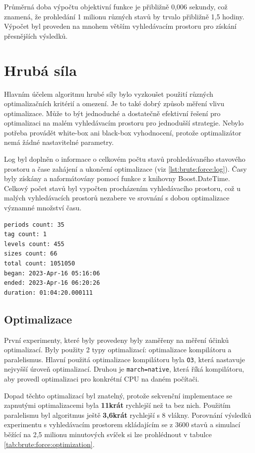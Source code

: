 Průměrná doba výpočtu objektivní funkce je přibližně 0,006 sekundy, což znamená, že prohledání 1 milionu různých stavů by trvalo přibližně 1,5 hodiny.
Výpočet byl proveden na mnohem větším vyhledávacím prostoru pro získání přesnějších výsledků.

\section{Hrubá síla}
Hlavním účelem algoritmu hrubé síly bylo vyzkoušet použití různých optimalizačních kritérií a omezení.
Je to také dobrý způsob měření vlivu optimalizace.
Může to být jednoduché a dostatečně efektivní řešení pro optimalizaci na malém vyhledávacím prostoru pro jednodušší strategie.
Nebylo potřeba provádět white-box ani black-box vyhodnocení, protože optimalizátor nemá žádné nastavitelné parametry.

Log byl doplněn o informace o celkovém počtu stavů prohledávaného stavového prostoru a čase zahájení a ukončení optimalizace (viz \ref{lst:brute:force:log}).
Časy byly získány a naformátovány pomocí funkce z knihovny Boost.DateTime.
Celkový počet stavů byl vypočten procházením vyhledávacího prostoru, což u malých vyhledávacích prostorů nezabere ve srovnání s dobou optimalizace významné množství času.

\begin{lstlisting}[caption={~Rozšíření logu pro algoritmus hrubé síly},label={lst:brute:force:log},captionpos=t,abovecaptionskip=-\medskipamount,belowcaptionskip=\medskipamount]
periods count: 35
tag count: 1
levels count: 455
sizes count: 66
total count: 1051050
began: 2023-Apr-16 05:16:06
ended: 2023-Apr-16 06:20:26
duration: 01:04:20.000111
\end{lstlisting}

\subsection{Optimalizace}
První experimenty, které byly provedeny byly zaměřeny na měření účinků optimalizací.
Byly použity 2 typy optimalizací: optimalizace kompilátoru a paralelismus.
Hlavní použitá optimalizace kompilátoru byla \texttt{O3}, která nastavuje nejvyšší úroveň optimalizací.
Druhou je \texttt{march=native}, která říká kompilátoru, aby provedl optimalizaci pro konkrétní CPU na daném počítači.

Dopad těchto optimalizací byl znatelný, protože sekvenční implementace se zapnutými optimalizacemi byla \textbf{11krát} rychlejší než ta bez nich.
Použitím paralelismu byl algoritmus ještě \textbf{3,6krát} rychlejší s 8 vlákny.
Porovnání výsledků experimentu s vyhledávacím prostorem skládajícím se z 3600 stavů a simulací běžící na 2,5 milionu minutových svíček si lze prohlédnout v tabulce \ref{tab:brute:force:optimization}.

